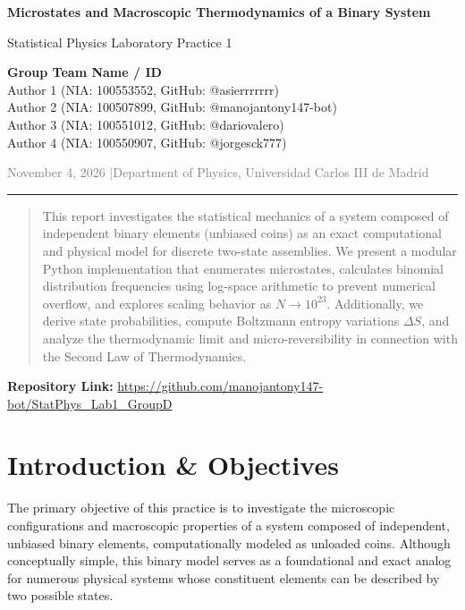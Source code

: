 \documentclass[11pt, a4paper]{article}
\begin{document}
\begin{flushleft}
{\Huge \bfseries \color{Black} Microstates and Macroscopic Thermodynamics of a Binary System \par}
\vspace{0.5em}
{\Large \color{DarkGray} Statistical Physics Laboratory Practice 1 \par}
\vspace{1.5em}
{\large
\textbf{Group Team Name / ID} \\
Author 1 (NIA: 100553552, GitHub: @asierrrrrrr) \\
Author 2 (NIA: 100507899, GitHub: @manojantony147-bot) \\
Author 3 (NIA: 100551012, GitHub: @dariovalero) \\
Author 4 (NIA: 100550907, GitHub: @jorgesck777)
\par}
\vspace{1em}
\textcolor{gray}{November 4, 2026 \quad|\quad Department of Physics, Universidad Carlos III de Madrid}
\end{flushleft}

\vspace{0.5em}
{\color{Black}\hrule height 1.5pt}
\vspace{1.5em}

\begin{abstract}
This report investigates the statistical mechanics of a system composed of independent
binary elements (unbiased coins) as an exact computational and physical model for discrete
two-state assemblies. We present a modular Python implementation that enumerates microstates,
calculates binomial distribution frequencies using log-space arithmetic to prevent
numerical overflow, and explores scaling behavior as $N\rightarrow10^{23}$. Additionally, we derive state
probabilities, compute Boltzmann entropy variations $\Delta S$, and analyze the thermodynamic
limit and micro-reversibility in connection with the Second Law of Thermodynamics.
\end{abstract}

\noindent \textbf{Repository Link:} \url{https://github.com/manojantony147-bot/StatPhys_Lab1_GroupD}

\vspace{2em}

\tableofcontents

\newpage

\section{Introduction \& Objectives}
The primary objective of this practice is to investigate the microscopic configurations and macroscopic properties of a system composed of independent, unbiased binary elements, computationally modeled as unloaded coins. Although conceptually simple, this binary model serves as a foundational and exact analog for numerous physical systems whose constituent elements can be described by two possible states. 
\end{document}

